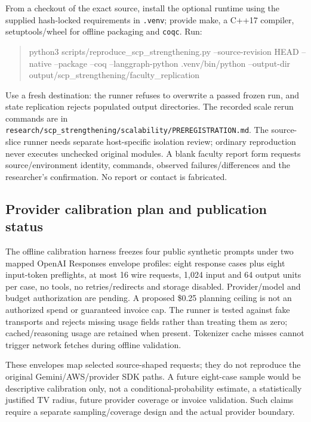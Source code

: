 \documentclass[11pt,a4paper]{article}
\newcommand{\cp}[1]{\nolinkurl{#1}}
\begin{document}
From a checkout of the exact source, install the optional runtime using the supplied hash-locked requirements in \cp{.venv}; provide make, a C++17 compiler, setuptools/wheel for offline packaging and \texttt{coqc}. Run:
\begin{quote}\small\ttfamily
python3 scripts/reproduce\_scp\_strengthening.py\newline
\quad --source-revision HEAD --native --package --coq\newline
\quad --langgraph-python .venv/bin/python\newline
\quad --output-dir output/scp\_strengthening/faculty\_replication
\end{quote}
Use a fresh destination: the runner refuses to overwrite a passed frozen run, and state replication rejects populated output directories. The recorded scale rerun commands are in \cp{research/scp_strengthening/scalability/PREREGISTRATION.md}. The source-slice runner needs separate host-specific isolation review; ordinary reproduction never executes unchecked original modules. A blank faculty report form requests source/environment identity, commands, observed failures/differences and the researcher's confirmation. No report or contact is fabricated.

\subsection{Provider calibration plan and publication status}
The offline calibration harness freezes four public synthetic prompts under two mapped OpenAI Responses envelope profiles: eight response cases plus eight input-token preflights, at most 16 wire requests, 1,024 input and 64 output units per case, no tools, no retries/redirects and storage disabled. Provider/model and budget authorization are pending. A proposed \$0.25 planning ceiling is not an authorized spend or guaranteed invoice cap. The runner is tested against fake transports and rejects missing usage fields rather than treating them as zero; cached/reasoning usage are retained when present. Tokenizer cache misses cannot trigger network fetches during offline validation.

These envelopes map selected source-shaped requests; they do not reproduce the original Gemini/AWS/provider SDK paths. A future eight-case sample would be descriptive calibration only, not a conditional-probability estimate, a statistically justified TV radius, future provider coverage or invoice validation. Such claims require a separate sampling/coverage design and the actual provider boundary.
\end{document}
